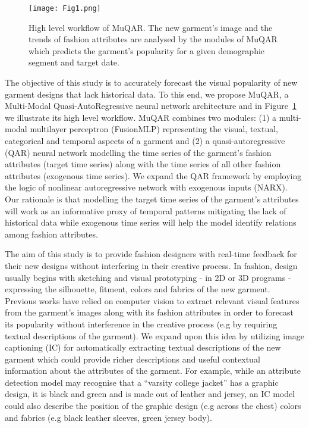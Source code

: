 \documentclass{article}
\begin{document}
\begin{figure}[ht]
    \centering
    \texttt{[image: Fig1.png]}
    \caption{High level workflow of MuQAR. The new garment's image and the trends of fashion attributes are analysed by the modules of MuQAR which predicts the garment's popularity for a given demographic segment and target date.}
    \label{fig:highlevel}
\end{figure}

The objective of this study is to accurately forecast the visual popularity of new garment designs that lack historical data. 
To this end, we propose MuQAR, a Multi-Modal Quasi-AutoRegressive neural network architecture and in Figure~\ref{fig:highlevel} we illustrate its high level workflow. 
MuQAR combines two modules: (1) a multi-modal multilayer perceptron (FusionMLP) representing the visual, textual, categorical and temporal aspects of a garment and (2) a quasi-autoregressive (QAR) neural network modelling the time series of the garment's fashion attributes (target time series) along with the time series of all other fashion attributes (exogenous time series).
We expand the QAR framework by employing the logic of nonlinear autoregressive network with exogenous inputs (NARX).
Our rationale is that modelling the target time series of the garment's attributes will work as an informative proxy of temporal patterns mitigating the lack of historical data while exogenous time series will help the model identify relations among fashion attributes.

The aim of this study is to provide fashion designers with real-time feedback for their new designs without interfering in their creative process. 
In fashion, design usually begins with sketching and visual prototyping - in 2D or 3D programs - expressing the silhouette, fitment, colors and fabrics of the new garment. 
Previous works have relied on computer vision to extract relevant visual features from the garment's images along with its fashion attributes in order to forecast its popularity without interference in the creative process (e.g by requiring textual descriptions of the garment).
We expand upon this idea by utilizing image captioning (IC) for automatically extracting textual descriptions of the new garment which could provide richer descriptions and useful contextual information about the attributes of the garment. 
For example, while an attribute detection model may recognise that a ``varsity college jacket'' has a graphic design, it is black and green and is made out of leather and jersey, an IC model could also describe the position of the graphic design (e.g across the chest) colors and fabrics (e.g black leather sleeves, green jersey body).
\end{document}
